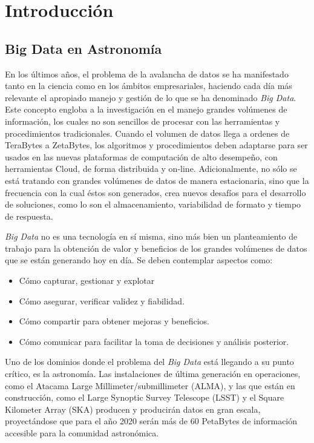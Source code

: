 \section{Introducción}

\subsection{Big Data en Astronomía}

En los últimos años, el problema de la avalancha de datos se ha manifestado
tanto en la ciencia como en los ámbitos empresariales, haciendo cada
día más relevante el apropiado manejo y gestión de lo que se ha denominado 
\emph{Big Data}.
Este concepto engloba a la investigación en el manejo grandes volúmenes de información, los cuales no son sencillos de procesar con las herramientas
y procedimientos tradicionales. Cuando el volumen de datos llega a ordenes
de TeraBytes a ZetaBytes, los algoritmos y procedimientos deben adaptarse
para ser usados en las nuevas plataformas de computación de alto desempeño, 
con herramientas Cloud, de forma distribuida y on-line.
Adicionalmente, no sólo se está tratando con grandes volúmenes de datos
de manera estacionaria, sino que la frecuencia con la cual éstos son generados,
crea nuevos desafíos para el desarrollo de soluciones,
como lo son el almacenamiento, variabilidad de formato y tiempo de respuesta.

\emph{Big Data} no es una tecnología en sí misma, sino más bien un planteamiento de
trabajo para la obtención de valor y beneficios de los grandes volúmenes de
datos que se están generando hoy en día. Se deben contemplar aspectos como:

\begin{itemize}
    \item Cómo capturar, gestionar y explotar
    \item Cómo asegurar, verificar validez y fiabilidad.
    \item Cómo compartir para obtener mejoras y beneficios.
    \item Cómo comunicar para facilitar la toma de decisiones y análisis posterior.
\end{itemize}


Uno de los dominios donde el problema del \emph{Big Data} está llegando
a su punto crítico, es la astronomía. Las instalaciones de última generación 
en operaciones, como el Atacama Large Millimeter/submillimeter (ALMA),
y las que están en construcción, como el Large Synoptic Survey Telescope (LSST) y el Square Kilometer Array (SKA)
producen y producirán datos en gran escala, proyectándose que para el año 2020
serán más de 60 PetaBytes de información accesible para la comunidad astronómica.

